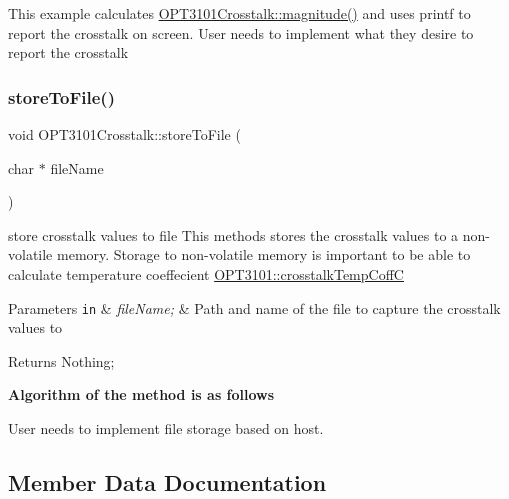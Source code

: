 \begin{DoxyItemize}
\item This example calculates \mbox{\hyperlink{class_o_p_t3101_crosstalk_acb6217116c652bc7c0c84e7b86504f18}{O\+P\+T3101\+Crosstalk\+::magnitude()}} and uses printf to report the crosstalk on screen. User needs to implement what they desire to report the crosstalk 
\end{DoxyItemize}\mbox{\label{class_o_p_t3101_crosstalk_abbfaa9d700ec5bac95dd88316b1dafe0}} 
\subsubsection{\texorpdfstring{store\+To\+File()}{storeToFile()}}
{\footnotesize\ttfamily void O\+P\+T3101\+Crosstalk\+::store\+To\+File (\begin{DoxyParamCaption}\item[{char $\ast$}]{file\+Name }\end{DoxyParamCaption})}



store crosstalk values to file This methods stores the crosstalk values to a non-\/volatile memory. Storage to non-\/volatile memory is important to be able to calculate temperature coeffecient \mbox{\hyperlink{class_o_p_t3101_1_1crosstalk_temp_coff_c}{O\+P\+T3101\+::crosstalk\+Temp\+CoffC}} 


\begin{DoxyParams}[1]{Parameters}
\mbox{\tt in}  & {\em file\+Name;} & Path and name of the file to capture the crosstalk values to \\
\hline
\end{DoxyParams}
\begin{DoxyReturn}{Returns}
Nothing; 
\end{DoxyReturn}
{\bfseries Algorithm of the method is as follows}
\begin{DoxyItemize}
\item User needs to implement file storage based on host. 
\end{DoxyItemize}

\subsection{Member Data Documentation}
\mbox{\label{class_o_p_t3101_crosstalk_a431124b7eed113a2969971ebec49a3a0}} 
